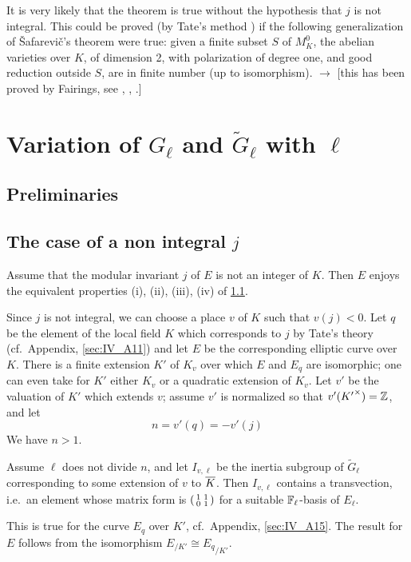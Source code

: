 \begin{obs}
It is very likely that the theorem is true without the hypothesis that $j$ is
not integral. This could be proved (by Tate's method \cite{38}) if the
following generalization of \v Safarevi\v c's theorem were true: given a finite
subset $S$ of $M_K^0$, the abelian varieties over $K$, of dimension 2, with
polarization of degree one, and good reduction outside $S$, are in finite
number (up to isomorphism). $\to$ [this has been proved by Fairings, see
\cite{54}, \cite{56}, \cite{82}.]
\end{obs}

\section{Variation of \texorpdfstring{$G_\ell$}{Gℓ} and
\texorpdfstring{$\widetilde{G}_\ell$}{Ḡℓ} with \texorpdfstring{$\ell$}{ℓ}}
\label{sec:IV_3}

\subsection{Preliminaries}
\label{sec:IV_31}

\subsection{The case of a non integral $j$}
\label{sec:IV_32}
\dpage
\begin{thm}
	Assume that the modular invariant $j$ of $E$ is not an integer of $K$.
	Then $E$ enjoys the equivalent properties (i), (ii), (iii), (iv) of
	\ref{sec:IV_31}.
\end{thm}
Since $j$ is not integral, we can choose a place $v$ of $K$ such
that $v(j) < 0$. Let $q$ be the element of the local field $K$ which
corresponds to $j$ by Tate's theory (cf.\ Appendix, \ref{sec:IV_A11}) and let $E$
be the corresponding elliptic curve over $K$. There is a finite
extension $K'$ of $K_v$ over which $E$ and $E_q$ are isomorphic; one
can even take for $K'$ either $K_v$ or a quadratic extension of $K_v$.
Let $v'$ be the valuation of $K'$ which extends $v$; assume $v'$ is
normalized so that $v'({K'}^\times) = \mathbb{Z}$, and let
\[
	n = v'(q) = - v'(j)
\]
We have $n > 1$.

\begin{lem}\label{lem:IV_32_1}
	Assume $\ell$ does not divide $n$, and let $I_{v, \ell}$ be the inertia
	subgroup of $\widetilde{G}_\ell$ corresponding to some extension of $v$
	to $\overline{K}$.  Then $I_{v, \ell}$ contains a transvection, i.e.\ an
	element whose matrix form is $
	\begin{psmallmatrix}
		1 & 1 \\
		0 & 1
	\end{psmallmatrix}
	$ for a suitable $\mathbb{F}_\ell$-basis of $E_\ell$.
\end{lem}
This is true for the curve $E_q$ over $K'$, cf.\ Appendix, \ref{sec:IV_A15}.
The result for $E$ follows from the isomorphism $E_{/K'} \cong {E_q}_{/K'}$.


